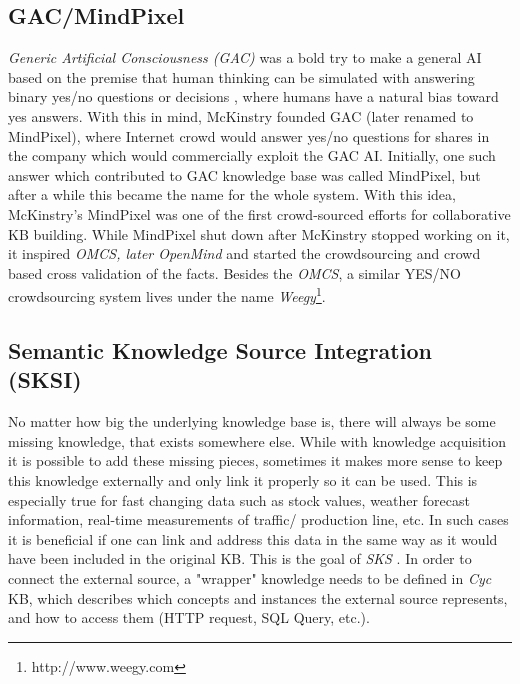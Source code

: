 \subsection{GAC/MindPixel}
\label{section:r:gac}
\emph{Generic Artificial Consciousness (GAC)} was a bold try to make a general
AI based on
the premise that human thinking can be simulated with answering binary yes/no
questions or decisions \parencite{McKinstry2008}, where humans have a natural 
bias toward yes answers. With this in mind, McKinstry founded GAC (later renamed
to MindPixel), where Internet crowd would answer yes/no questions for shares
in the company which would commercially exploit the GAC AI. Initially, one such
answer which contributed to GAC knowledge base was called MindPixel, but after
a while this became the name for the whole system. With this idea, McKinstry's
MindPixel was one of the first crowd-sourced efforts for collaborative KB
building. While MindPixel shut down after McKinstry stopped working on it,
it inspired \emph{OMCS, later OpenMind} and started the crowdsourcing and
crowd based cross validation of the facts. Besides the \emph{OMCS}, a similar
YES/NO crowdsourcing system lives under the name 
\emph{Weegy}\footnote{http://www.weegy.com}.

\subsection{Semantic Knowledge Source Integration (SKSI)}
\label{section:r:sksi}
No matter how big the underlying knowledge base is, there will always be some
missing knowledge, that exists somewhere else. While with knowledge acquisition
it is possible to add these missing pieces, sometimes it makes more sense to
keep this knowledge externally and only link it properly so it can be used.
This is especially true for fast changing data such as stock values, weather
forecast information, real-time measurements of traffic/ production line, etc.
In such cases it is beneficial if one can link and address this data in the 
same way as it would have been included in the original KB. This is the goal
of \emph{SKS} \parencite{Masters2007}.
In order to connect the external source, a "wrapper" knowledge needs to be
defined in \emph{Cyc} KB, which describes which concepts and instances the external
source represents, and how to access them (HTTP request, SQL Query, etc.).

